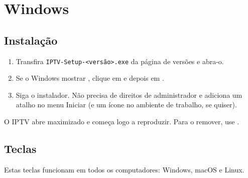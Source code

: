 
\section{Windows}
\label{sec:windows}

\subsection{Instalação}
\begin{enumerate}
  \item Transfira \texttt{IPTV-Setup-\textless versão\textgreater.exe} da
        página de versões e abra-o.
  \item Se o Windows mostrar , clique
        em  e depois em .
  \item Siga o instalador. Não precisa de direitos de administrador e
        adiciona um atalho no menu Iniciar (e um ícone no ambiente de
        trabalho, se quiser).
\end{enumerate}
O IPTV abre maximizado e começa logo a reproduzir. Para o remover, use
.

\subsection{Teclas}
\label{sec:keys}
Estas teclas funcionam em todos os computadores: Windows, macOS e Linux.

